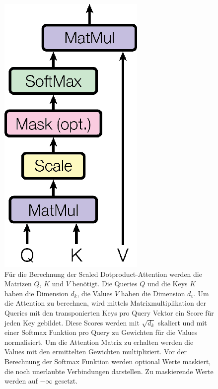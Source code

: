\documentclass[conference]{IEEEtran}
\begin{document}
\begin{figure}[htbp]
\centerline{\includegraphics{img/scaled_dotproduct_attention.png}}
\caption{Für die Berechnung der Scaled Dotproduct-Attention werden die Matrizen $Q$, $K$ und $V$ benötigt. Die Queries $Q$ und die Keys $K$ haben die Dimension $d_k$, die Values $V$ haben die Dimension $d_v$. Um die Attention zu berechnen, wird mittels Matrixmultiplikation der Queries mit den transponierten Keys pro Query Vektor ein Score für jeden Key gebildet. Diese Scores werden mit $\sqrt{d_k}$ skaliert und mit einer Softmax Funktion pro Query zu Gewichten für die Values normalisiert. Um die Attention Matrix zu erhalten werden die Values mit den ermittelten Gewichten multipliziert. Vor der Berechnung der Softmax Funktion werden optional Werte maskiert, die noch unerlaubte Verbindungen darstellen. Zu maskierende Werte werden auf $-\infty$ gesetzt. \cite{attention_is_all_you_need}}
\label{fig:2}
\end{figure}
\end{document}
